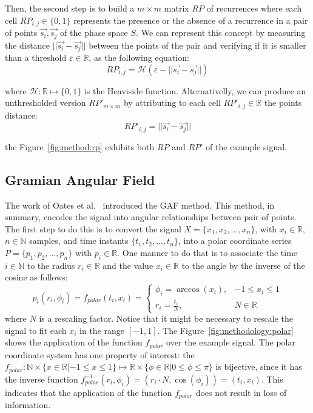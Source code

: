 

Then, the second step is to build a $m \times m$ matrix $RP$ of recurrences where each cell $RP_{i,j} \in \{0,1\}$ represents the presence or the absence of a recurrence in a pair of points $\vec{s_i},\vec{s_j}$ of the phase space $S$. We can represent this concept by measuring the distance $||\vec{s_i} - \vec{s_j}||$ between the points of the pair and verifying if it is smaller than a threshold $\varepsilon \in \mathbb{R}$, as the following equation:
\begin{equation}
    RP_{i,j} = \mathcal{H}(\varepsilon - ||\vec{s_i} - \vec{s_j}||)
\end{equation}

\noindent where $\mathcal{H}: \mathbb{R} \mapsto \{0,1\}$ is the Heaviside function. Alternativelly, we can produce an unthresholded version $RP'_{m \times m}$ by attributing to each cell $RP'_{i,j} \in \mathbb{R}$ the points distance:
\begin{equation}
    RP'_{i,j} = ||\vec{s_i} - \vec{s_j}||
\end{equation}  

\noindent the Figure~\ref{fig:method:rp} exhibits both $RP$ and $RP'$ of the example signal.




\subsection{Gramian Angular Field}

The work of Oates et al.~\cite{gaf-mtf-1} introduced the \gls{GAF} method. This method, in summary, encodes the signal into angular relationships between pair of points. The first step to do this is to convert the signal $X=\{x_1,x_2,...,x_n\}$, with $x_i \in \mathbb{R}$, $n \in \mathbb{N}$ samples, and time instants $\{t_1,t_2,...,t_n\}$, into a polar coordinate series $P=\{p_1,p_2,...,p_n\}$ with $p_i \in \mathbb{R}$. One manner to do that is to associate the time $i \in \mathbb{N}$ to the radius $r_i \in \mathbb{R}$ and the value $x_i \in \mathbb{R}$ to the angle by the inverse of the cosine as follows:
\begin{equation}
    p_i(r_i, \phi_i) = f_{polar}(t_i, x_i) = 
    \begin{cases} 
        \phi_i = \arccos(x_i), & -1 \leq x_i \leq 1\\
        r_i = \frac{t_i}{N},     & N \in \mathbb{R}
    \end{cases}
\end{equation}
\noindent where $N$ is a rescaling factor. Notice that it might be necessary to rescale the signal to fit each $x_i$ in the range $[-1,1]$. The Figure~\ref{fig:methodology:polar} shows the application of the function $f_{polar}$ over the example signal. The polar coordinate system has one property of interest: the $f_{polar}: \mathbb{N} \times \{x \in \mathbb{R}| -1 \leq x \leq 1\} \mapsto \mathbb{R} \times \{\phi \in \mathbb{R}| 0 \leq \phi \leq \pi \}$ is bijective, since it has the inverse function $f_{polar}^{-1}(r_i, \phi_i)=(r_i \cdot N, \cos(\phi_i))=(t_i,x_i)$. This indicates that the application of the function $f_{polar}$ does not result in loss of information.

